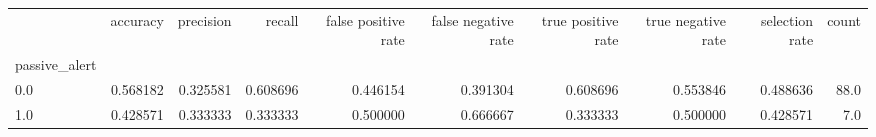 \begin{tabular}{lrrrrrrrrr}
\toprule
{} &  accuracy &  precision &    recall &  false positive rate &  false negative rate &  true positive rate &  true negative rate &  selection rate &  count \\
passive\_alert &           &            &           &                      &                      &                     &                     &                 &        \\
\midrule
0.0           &  0.568182 &   0.325581 &  0.608696 &             0.446154 &             0.391304 &            0.608696 &            0.553846 &        0.488636 &   88.0 \\
1.0           &  0.428571 &   0.333333 &  0.333333 &             0.500000 &             0.666667 &            0.333333 &            0.500000 &        0.428571 &    7.0 \\
\bottomrule
\end{tabular}

